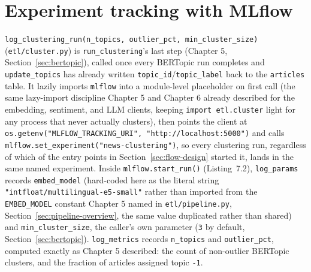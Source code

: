 \section{Experiment tracking with MLflow}
\label{sec:mlflow-tracking}
\begin{sloppypar}
\texttt{log\_clustering\_run(n\_topics, outlier\_pct, min\_cluster\_size)} (\texttt{etl/\allowbreak cluster.py}) is \texttt{run\_clustering}'s last step (Chapter 5, Section~\ref{sec:bertopic}), called once every BERTopic run completes and \texttt{update\_topics} has already written \texttt{topic\_id}/\texttt{topic\_label} back to the \texttt{articles} table. It lazily imports \texttt{mlflow} into a module-level placeholder on first call (the same lazy-import discipline Chapter 5 and Chapter 6 already described for the embedding, sentiment, and LLM clients, keeping \texttt{import etl.cluster} light for any process that never actually clusters), then points the client at \texttt{os.getenv("MLFLOW\_TRACKING\_URI", "http://localhost:5000")} and calls \texttt{mlflow.set\_experiment("news-clustering")}, so every clustering run, regardless of which of the entry points in Section~\ref{sec:flow-design} started it, lands in the same named experiment. Inside \texttt{mlflow.start\_run()} (Listing~7.2), \texttt{log\_params} records \texttt{embed\_model} (hard-coded here as the literal string \texttt{"intfloat/multilingual-e5-small"} rather than imported from the \texttt{EMBED\_MODEL} constant Chapter 5 named in \texttt{etl/\allowbreak pipeline.py}, Section~\ref{sec:pipeline-overview}, the same value duplicated rather than shared) and \texttt{min\_cluster\_size}, the caller's own parameter (\texttt{3} by default, Section~\ref{sec:bertopic}). \texttt{log\_metrics} records \texttt{n\_topics} and \texttt{outlier\_pct}, computed exactly as Chapter 5 described: the count of non-outlier BERTopic clusters, and the fraction of articles assigned topic \texttt{-1}.
\end{sloppypar}

